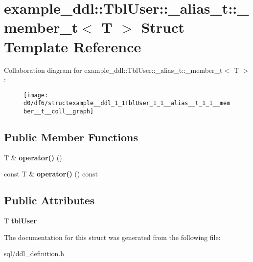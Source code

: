 \hypertarget{structexample__ddl_1_1TblUser_1_1__alias__t_1_1__member__t}{}\section{example\+\_\+ddl\+:\+:Tbl\+User\+:\+:\+\_\+alias\+\_\+t\+:\+:\+\_\+member\+\_\+t$<$ T $>$ Struct Template Reference}
\label{structexample__ddl_1_1TblUser_1_1__alias__t_1_1__member__t}


Collaboration diagram for example\+\_\+ddl\+:\+:Tbl\+User\+:\+:\+\_\+alias\+\_\+t\+:\+:\+\_\+member\+\_\+t$<$ T $>$\+:
\nopagebreak
\begin{figure}[H]
\begin{center}
\leavevmode
\texttt{[image: d0/df6/structexample\_\_ddl\_1\_1TblUser\_1\_1\_\_alias\_\_t\_1\_1\_\_member\_\_t\_\_coll\_\_graph]}
\end{center}
\end{figure}
\subsection*{Public Member Functions}
\begin{DoxyCompactItemize}
\item 
\hypertarget{structexample__ddl_1_1TblUser_1_1__alias__t_1_1__member__t_a66bb02f92dc1be4971ea6b1f75ce790d}{}T \& {\bfseries operator()} ()\label{structexample__ddl_1_1TblUser_1_1__alias__t_1_1__member__t_a66bb02f92dc1be4971ea6b1f75ce790d}

\item 
\hypertarget{structexample__ddl_1_1TblUser_1_1__alias__t_1_1__member__t_a2273ca99c99b188ea0fb729e9207c343}{}const T \& {\bfseries operator()} () const \label{structexample__ddl_1_1TblUser_1_1__alias__t_1_1__member__t_a2273ca99c99b188ea0fb729e9207c343}

\end{DoxyCompactItemize}
\subsection*{Public Attributes}
\begin{DoxyCompactItemize}
\item 
\hypertarget{structexample__ddl_1_1TblUser_1_1__alias__t_1_1__member__t_a4accf869132dd8ee66035217e3c48cda}{}T {\bfseries tbl\+User}\label{structexample__ddl_1_1TblUser_1_1__alias__t_1_1__member__t_a4accf869132dd8ee66035217e3c48cda}

\end{DoxyCompactItemize}


The documentation for this struct was generated from the following file\+:\begin{DoxyCompactItemize}
\item 
sql/ddl\+\_\+definition.\+h\end{DoxyCompactItemize}
